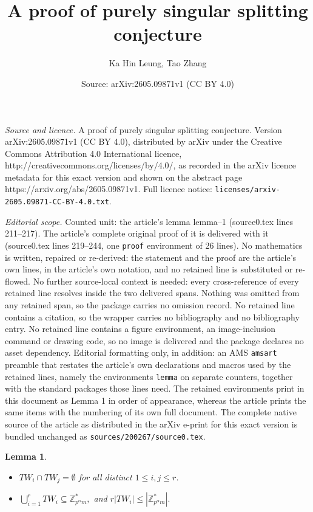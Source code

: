 \documentclass[10pt,a4paper]{amsart}
\title{A proof of purely singular splitting conjecture}
\author{Ka Hin Leung, Tao Zhang}
\date{Source: arXiv:2605.09871v1 (CC BY 4.0)}
\newtheorem{lemma}{Lemma}
\begin{document}
\maketitle

\noindent\emph{Source and licence.} A proof of purely singular splitting conjecture. Version arXiv:2605.09871v1 (CC BY 4.0), distributed by arXiv under the Creative Commons Attribution 4.0 International licence, http://creativecommons.org/licenses/by/4.0/, as recorded in the arXiv licence metadata for this exact version and shown on the abstract page https://arxiv.org/abs/2605.09871v1. Full licence notice: \texttt{licenses/arxiv-2605.09871-CC-BY-4.0.txt}.\par\smallskip

\noindent\textit{Editorial scope.} Counted unit: the article's lemma lemma--1 (source0.tex lines 211--217). The article's complete original proof of it is delivered with it (source0.tex lines 219--244, one \texttt{proof} environment of 26 lines). No mathematics is written, repaired or re-derived: the statement and the proof are the article's own lines, in the article's own notation, and no retained line is substituted or re-flowed.  No further source-local context is needed: every cross-reference of every retained line resolves inside the two delivered spans.  Nothing was omitted from any retained span, so the package carries no omission record.  No retained line contains a citation, so the wrapper carries no bibliography and no bibliography entry.  No retained line contains a figure environment, an image-inclusion command or drawing code, so no image is delivered and the package declares no asset dependency.  Editorial formatting only, in addition: an AMS \texttt{amsart} preamble that restates the article's own declarations and macros used by the retained lines, namely the environments \texttt{lemma} on separate counters, together with the standard packages those lines need.  The retained environments print in this document as Lemma 1 in order of appearance, whereas the article prints the same items with the numbering of its own full document.  The complete native source of the article as distributed in the arXiv e-print for this exact version is bundled unchanged as \texttt{sources/200267/source0.tex}.
\begin{lemma}\label{lemma--1}
	\begin{itemize}
		\item[(a)] \(TW_i \cap TW_j = \emptyset\) for all distinct \(1 \le i,j \le r\).
		\item[(b)] $\bigcup_{i=1}^{r} TW_i \subseteq \mathbb{Z}_{p^\alpha m}^{*},$
		and  $r|TW_i|\le|\mathbb{Z}_{p^\alpha m}^{*}|.$
	\end{itemize}
\end{lemma}
\end{document}
